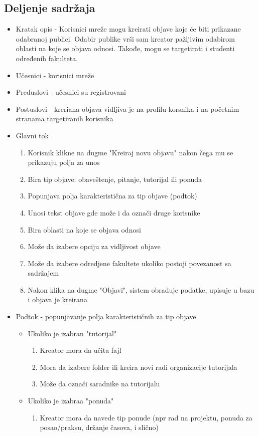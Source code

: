 \subsection{Deljenje sadržaja}
\begin{itemize}
\item Kratak opis - Korisnici mreže mogu kreirati objave koje će biti prikazane odabranoj publici. Odabir publike vrši sam kreator pažljivim odabirom oblasti na koje se objava odnosi. Takođe, mogu se targetirati i studenti određenih fakulteta.
\item Učesnici - korisnici mreže
\item Preduslovi - učesnici su registrovani
\item Postuslovi - kreriana objava vidljiva je na profilu korsnika i na početnim stranama targetiranih korisnika
\item Glavni tok
    \begin{enumerate}
	\item Korisnik klikne na dugme "Kreiraj novu objavu" nakon čega mu se prikazuju polja za unos
	\item Bira tip objave: obaveštenje, pitanje, tutorijal ili ponuda
	\item Popunjava polja karakteristična za tip objave (podtok)
	\item Unosi tekst objave gde može i da označi druge korisnike
    \item Bira oblasti na koje se objava odnosi
    \item Može da izabere opciju za vidljivost objave
    \item Može da izabere odredjene fakultete ukoliko postoji povezanost sa sadržajem
    \item Nakon klika na dugme "Objavi", sistem obrađuje podatke, upisuje u bazu i objava je kreirana
    \end{enumerate}
\item Podtok - popunjavanje polja karakterističnih za tip objave
    \begin{itemize}
        \item Ukoliko je izabran "tutorijal"
            \begin{enumerate}
            \item Kreator mora da učita fajl
            \item Mora da izabere folder ili kreira novi radi organizacije tutorijala
            \item Može da označi saradnike na tutorijalu
            \end{enumerate}
         \item Ukoliko je izabraa "ponuda"
            \begin{enumerate}
            \item Kreator mora da navede tip ponude (npr rad na projektu, ponuda za posao/praksu, držanje časova, i slično)
            \end{enumerate}    
	 \end{itemize}
\end{itemize}

